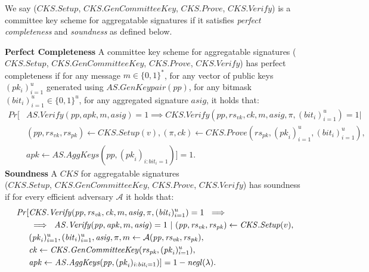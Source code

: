 \begin{definition}
\noindent We say ($\mathit{CKS.Setup}$, $\mathit{CKS.GenCommitteeKey}$, $\mathit{CKS.Prove}$, $\mathit{CKS.Verify}$) 
is a committee key scheme for aggregatable signatures if it satisfies \emph{perfect completeness} and 
\emph{soundness} as defined below.

\noindent \textbf{Perfect Completeness} A committee key scheme for aggregatable signatures 
($\mathit{CKS.Setup}$, $\mathit{CKS.GenCommitteeKey}$, $\mathit{CKS.Prove}$, $\mathit{CKS.Verify}$)
has perfect completeness if for any message $m \in \{0,1\}^*$, 
for any vector of public keys $(\mathit{pk_i})_{i=1}^{u}$ generated using $\mathit{AS.GenKeypair}(\mathit{pp})$, 
for any bitmask $(\mathit{bit_i})_{i=1}^{u} \in \{0,1\}^u$,  for any aggregated signature $\mathit{asig}$, 
it holds that: 
\vspace{-0.1cm}
\begin{align*}
\mathit{Pr}[&\mathit{AS.Verify}(\mathit{pp}, \mathit{apk}, m, \mathit{asig}) = 1 \implies 
\mathit{CKS.Verify}(\mathit{pp}, \mathit{rs}_{\mathit{vk}}, \mathit{ck}, m, \mathit{asig}, \pi, (\mathit{bit}_{i})_{i=1}^u) =1 | \\
& (\mathit{pp}, \mathit{rs}_{\mathit{vk}}, \mathit{rs}_{\mathit{pk}}) \leftarrow 
\mathit{CKS.Setup}(v), 
(\pi, \mathit{ck}) \leftarrow \mathit{CKS.Prove}(\mathit{rs}_{\mathit{pk}}, (\mathit{pk}_{i})_{i=1}^u, (\mathit{bit_i})_{i=1}^u), \\
& \mathit{apk} \leftarrow \mathit{AS.AggKeys}(\mathit{pp}, (\mathit{pk}_{i})_{i:\mathit{bit_i}=1})]=1.
\end{align*} 
\vspace{-0.08cm}
\noindent \textbf{Soundness} A $\mathit{CKS}$ for aggregatable signatures \\
($\mathit{CKS.Setup}$, $\mathit{CKS.GenCommitteeKey}$, $\mathit{CKS.Prove}$, $\mathit{CKS.Verify}$)
has soundness if for every efficient adversary $\mathcal{A}$ it holds that: 
\begin{align*}
\mathit{Pr}[&\mathit{CKS.Verify}(\mathit{pp}, \mathit{rs}_{\mathit{vk}}, \mathit{ck}, m,  \mathit{asig}, \pi, (\mathit{bit}_{i})_{i=1}^u) =1 \
 \implies \\
 &\implies \ \mathit{AS.Verify}(\mathit{pp}, \mathit{apk}, m, \mathit{asig}) = 1  \  |  \ 
 (\mathit{pp}, \mathit{rs}_{\mathit{vk}},\mathit{rs}_{\mathit{pk}}) \leftarrow \mathit{CKS.Setup}(v),\\
& (\mathit{pk}_{i})_{i=1}^u, (\mathit{bit}_{i})_{i=1}^u, \mathit{asig}, \pi, m  \leftarrow \mathcal{A}(\mathit{pp}, \mathit{rs}_{\mathit{vk}}, \mathit{rs}_{\mathit{pk}}), \\
& \mathit{ck} \leftarrow \mathit{CKS.GenCommitteeKey}(\mathit{rs}_{\mathit{pk}}, (\mathit{pk}_{i})_{i=1}^u), \\
& \mathit{apk} \leftarrow \mathit{AS.AggKeys}( \mathit{pp},( \mathit{pk}_{i})_{i:\mathit{bit_i}=1})] = 1 - \negl(\lambda).
\end{align*}
\end{definition}

